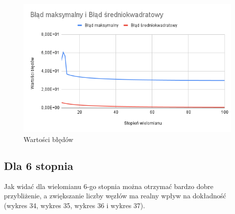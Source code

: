 \documentclass{article}
\begin{document}
\begin{figure}[H]
  \centering
  \begin{minipage}[b]{0.4\textwidth}
    \includegraphics[width=\textwidth]{img33.png}
    \caption{Wartości błędów}
  \end{minipage}
\end{figure}

\newpage

\subsection{Dla 6 stopnia}

\noindent
Jak widać dla wielomianu 6-go stopnia można otrzymać bardzo dobre przybliżenie, a zwiększanie liczby węzłów ma realny wpływ na dokładność (wykres 34, wykres 35, wykres 36 i wykres 37).
\end{document}
